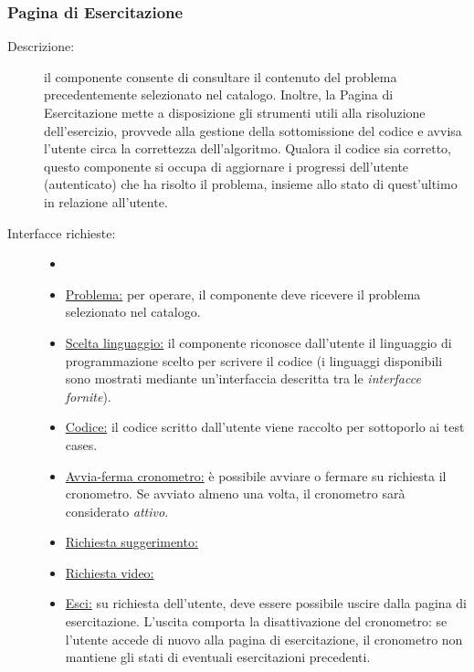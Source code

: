 \documentclass[11pt, a4paper]{article}
\theoremstyle{definition} %
\begin{document}
\subsubsection{Pagina di Esercitazione}\label{exepag}
\begin{description}
    \item[Descrizione:] il componente consente di consultare il contenuto del problema
    precedentemente selezionato nel catalogo. Inoltre, la Pagina di Esercitazione mette
    a disposizione gli strumenti utili alla risoluzione dell'esercizio, provvede alla
    gestione della sottomissione del codice e avvisa l'utente circa la correttezza dell'algoritmo.
    Qualora il codice sia corretto, questo componente si occupa di aggiornare i progressi
    dell'utente (autenticato) che ha risolto il problema, insieme allo stato di quest'ultimo
    in relazione all'utente.

    \item[Interfacce richieste:]
    \begin{itemize}
        \item[]

        \item \underline{Problema:} per operare, il componente deve ricevere il problema
        selezionato nel catalogo.

        \item \underline{Scelta linguaggio:} il componente riconosce dall'utente il
        linguaggio di programmazione scelto per scrivere il codice (i linguaggi disponibili
        sono mostrati mediante un'interfaccia descritta tra le \textit{interfacce fornite}).

        \item \underline{Codice:} il codice scritto dall'utente viene raccolto
        per sottoporlo ai test cases.

        \item \underline{Avvia-ferma cronometro:} è possibile avviare o fermare su
        richiesta il cronometro. Se avviato almeno una volta, il cronometro sarà considerato
        \textit{attivo}.

        \item \underline{Richiesta suggerimento:}
        \item \underline{Richiesta video:}
        \item \underline{Esci:} su richiesta dell'utente, deve essere possibile uscire
        dalla pagina di esercitazione. L'uscita comporta la disattivazione del
        cronometro: se l'utente accede di nuovo alla pagina di esercitazione,
        il cronometro non mantiene gli stati di eventuali esercitazioni precedenti.
    \end{itemize}


\end{description}
\end{document}
